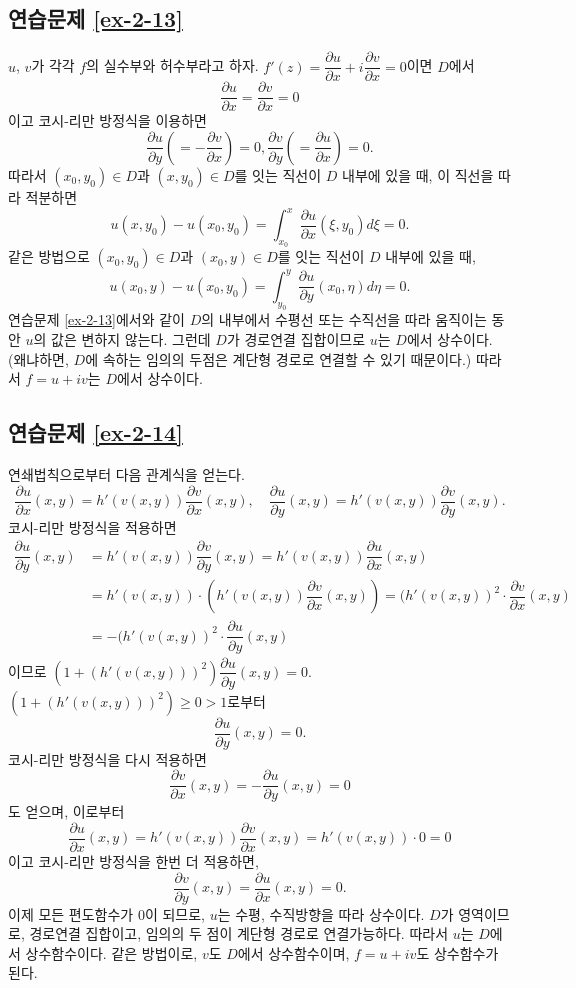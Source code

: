 \subsection*{연습문제 \ref{ex-2-13}}

$u$, $v$가 각각 $f$의 실수부와 허수부라고 하자.
$f'(z) = \dfrac{\partial u}{\partial x} + i \dfrac{\partial v}{\partial x} = 0$이면
$D$에서
\[
\dfrac{\partial u}{\partial x} = \dfrac{\partial v}{\partial x} = 0
\]
이고 코시-리만 방정식을 이용하면
\[
\dfrac{\partial u}{\partial y} \left( = - \dfrac{\partial v}{\partial x} \right) =0,
\dfrac{\partial v}{\partial y} \left( = \dfrac{\partial u}{\partial x} \right) =0.
\]
따라서   $(x_0,y_0)\in D$과 $(x, y_0)\in D$를 잇는 직선이  $D$ 내부에 있을 때, 이 직선을 따라 적분하면
\[
u(x,y_0) - u(x_0,y_0) = \int_{x_0}^x \dfrac{\partial u}{\partial x}(\xi, y_0) d\xi = 0.
\]
같은 방법으로 
 $(x_0,y_0)\in D$과 $(x_0, y)\in D$를 잇는 직선이  $D$ 내부에 있을 때, 
\[
u(x_0,y) - u(x_0,y_0) = \int_{y_0}^y \dfrac{\partial u}{\partial y}(x_0, \eta) d\eta = 0.
\]
연습문제 \ref{ex-2-13}에서와 같이 
$D$의 내부에서 수평선 또는 수직선을 따라 움직이는 동안 $u$의 값은 변하지 않는다.
그런데 $D$가 경로연결 집합이므로 $u$는 $D$에서 상수이다.
(왜냐하면, $D$에 속하는 임의의  두점은 계단형 경로로 연결할 수 있기 때문이다.)
따라서 $f=u+iv$는 $D$에서 상수이다.

\subsection*{연습문제 \ref{ex-2-14}}

연쇄법칙으로부터 다음 관계식을 얻는다.
\[
\dfrac{\partial u}{\partial x} (x,y) = h'(v(x,y))\dfrac{\partial v}{\partial x}  (x,y),
\quad
\dfrac{\partial u}{\partial y} (x,y) = h'(v(x,y))\dfrac{\partial v}{\partial y}  (x,y).
\]
코시-리만 방정식을 적용하면
\begin{align*}
\dfrac{\partial u}{\partial y} (x,y) 
&= h'(v(x,y))\dfrac{\partial v}{\partial y}  (x,y)
= h'(v(x,y))\dfrac{\partial u}{\partial x}  (x,y) \\
&= h'(v(x,y))\cdot\left( h'(v(x,y))\dfrac{\partial v}{\partial x}(x,y) \right) 
= (h'(v(x,y))^2\cdot \dfrac{\partial v}{\partial x}(x,y) \\
&= - (h'(v(x,y))^2\cdot \dfrac{\partial u}{\partial y}(x,y)
\end{align*}
이므로
$(1+(h'(v(x,y)))^2) \dfrac{\partial u}{\partial y}(x,y) = 0$.
$(1+(h'(v(x,y)))^2)\ge0 >1$로부터
\[
\dfrac{\partial u}{\partial y}(x,y) = 0.
\]
코시-리만 방정식을 다시 적용하면
\[
\dfrac{\partial v}{\partial x}(x,y) = - \dfrac{\partial u}{\partial y}(x,y) = 0
\]
도 얻으며, 이로부터
\[
\dfrac{\partial u}{\partial x} (x,y) = h'(v(x,y))\dfrac{\partial v}{\partial x}  (x,y)
= h'(v(x,y))\cdot 0 = 0
\]
이고 코시-리만 방정식을 한번 더 적용하면,
\[
\dfrac{\partial v}{\partial y}(x,y) = \dfrac{\partial u}{\partial x}(x,y) = 0.
\]
이제 모든 편도함수가 $0$이 되므로,
$u$는 수평, 수직방향을 따라 상수이다.
$D$가 영역이므로, 경로연결 집합이고, 임의의 두 점이 계단형 경로로 연결가능하다.
따라서 $u$는 $D$에서 상수함수이다.
같은 방법이로, $v$도 $D$에서 상수함수이며,
$f=u+iv$도 상수함수가 된다.

